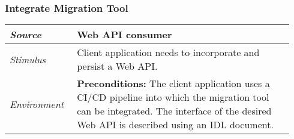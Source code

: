 \subsubsection{Integrate Migration Tool}
\label{subsubsec:UseCase:IntegrateTool}

\vspace{-2mm}
\begin{center}
    \def\arraystretch{1.5}
    \begin{longtable}{ p{0.22\linewidth} p{0.72\linewidth} }
    \hline
        \textit{Source} & Web API consumer\\
    \hline
        \textit{Stimulus} & Client application needs to incorporate and persist a Web API. \\
    \hline
    	\textit{Environment} & \textbf{Preconditions:} The client application uses a CI/CD pipeline into which the migration tool can be integrated. The interface of the desired Web API is described using an IDL document.
    	

\end{longtable}
\end{center}
